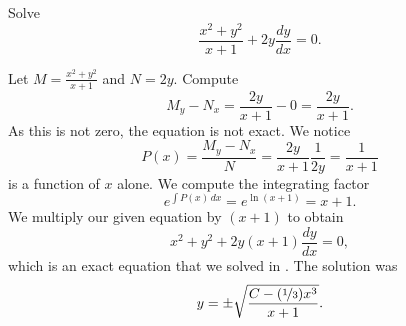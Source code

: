 \begin{example}
Solve
\begin{equation*}
\frac{x^2+y^2}{x+1} + 2y \frac{dy}{dx} = 0 .
\end{equation*}

Let $M= \frac{x^2+y^2}{x+1}$ and $N=2y$.
Compute
\begin{equation*}
M_y-N_x = \frac{2y}{x+1} - 0 = \frac{2y}{x+1} .
\end{equation*}
As this is not zero, the equation is not exact.  We notice 
\begin{equation*}
P(x) = \frac{M_y-N_x}{N} = \frac{2y}{x+1} \frac{1}{2y} = \frac{1}{x+1} 
\end{equation*}
is a function of $x$ alone.    We compute the integrating factor
\begin{equation*}
e^{\int  P(x) \, dx}
=
e^{\ln (x+1)} = x+1 .
\end{equation*}
We multiply our given equation by $(x+1)$ to obtain
\begin{equation*}
x^2+y^2 + 2y(x+1) \frac{dy}{dx} = 0 ,
\end{equation*}
which is an exact equation that we solved in
.  The solution was
\begin{equation*}
y = \pm \sqrt{\frac{C-(\nicefrac{1}{3})x^3}{x+1}} .
\end{equation*}
\end{example}

